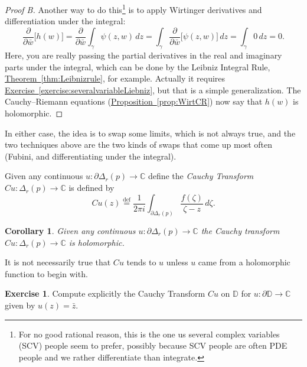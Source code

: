 \documentclass[12pt,openany]{book}
\newcommand{\C}{{\mathbb{C}}}
\newcommand{\D}{{\mathbb{D}}}
\newcommand{\myindex}[1]{#1\index{#1}}
\theoremstyle{plain}
\newtheorem{cor}[thm]{Corollary}
\theoremstyle{remark}
\theoremstyle{definition}
\newenvironment{exbox}{%
    \def\FrameCommand{\vrule width 1pt \relax\hspace {10pt}}%
    \MakeFramed {\advance \hsize -\width \FrameRestore }%
}{%
    \endMakeFramed
}
\theoremstyle{exercise}
\newtheorem{exercise}{Exercise}[section]
\theoremstyle{example}
\newcommand{\exerciseref}[1]{\hyperref[#1]{Exercise~\ref*{#1}}}
\newcommand{\thmref}[1]{\hyperref[#1]{Theorem~\ref*{#1}}}
\newcommand{\propref}[1]{\hyperref[#1]{Proposition~\ref*{#1}}}
\begin{document}
\begin{proof}[Proof B]
Another way to do this\footnote{%
For no good rational reason, this is the one us several complex variables
(SCV) people seem to prefer, possibly because SCV people are often PDE
people and we rather differentiate than integrate.}
is to apply Wirtinger derivatives and differentiation under the integral:
\begin{equation*}
\frac{\partial}{\partial \bar{w}}
\bigl[
h(w)
\bigr]
=
\frac{\partial}{\partial \bar{w}}
\int_\gamma \psi(z,w) \, dz
=
\int_\gamma
\frac{\partial}{\partial \bar{w}}
\bigl[
\psi(z,w)
\bigr]
\, dz
= \int_\gamma 0 \, dz = 0.
\end{equation*}
Here, you are really passing the partial derivatives in the real and
imaginary parts under the integral, which can be done by 
the Leibniz Integral Rule, \thmref{thm:Leibnizrule}, for example.
Actually it requires \exerciseref{exercise:severalvariableLiebniz},
but that is a simple generalization.  The Cauchy--Riemann equations
(\propref{prop:WirtCR}) now
say that $h(w)$ is holomorphic.
\end{proof}

In either case, the idea is to swap some limits, which is not always true,
and the two techniques above are the two kinds of swaps that come up most
often (Fubini, and differentiating under the integral).

Given any continuous $u \colon \partial \Delta_r(p) \to \C$ define
the \emph{\myindex{Cauchy Transform}} $Cu \colon \Delta_r(p) \to \C$ is defined by
\begin{equation*}
Cu(z)
\overset{\text{def}}{=}
\frac{1}{2\pi i}
\int_{\partial \Delta_r(p)}
\frac{f(\zeta)}{\zeta-z}\, d\zeta .
\end{equation*}

\begin{cor}
Given any continuous $u \colon \partial \Delta_r(p) \to \C$ the
Cauchy transform $Cu \colon \Delta_r(p) \to \C$ is holomorphic.
\end{cor}

It is not necessarily true that $Cu$ tends to $u$ unless $u$ came from 
a holomorphic function to begin with.

\begin{exbox}
\begin{exercise}
Compute explicitly
the Cauchy Transform $Cu$ on $\D$ for $u \colon \partial \D \to \C$
given by $u(z) = \bar{z}$.
\end{exercise}
\end{exbox}
\end{document}
